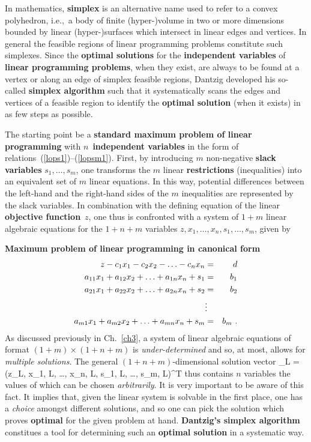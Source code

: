\medskip
\noindent
In mathematics, {\bf simplex} is an alternative name used to refer 
to a convex polyhedron, i.e.,~a body of finite (hyper-)volume in 
two or more dimensions bounded by linear (hyper-)surfaces which 
intersect in linear edges and vertices. In general the feasible 
regions of linear programming problems constitute such simplexes. 
Since the {\bf optimal solutions} for the {\bf independent 
variables} of {\bf linear programming problems},
when they exist, are always to be found at a vertex or along an 
edge of simplex feasible regions, Dantzig developed his so-called 
{\bf simplex algorithm} such that it systematically scans the 
edges and vertices of a feasible region to identify the {\bf 
optimal solution} (when it exists) in as few steps as possible.

\medskip
\noindent
The starting point be a {\bf standard maximum problem of linear 
programming} with $n$~{\bf independent variables} in the form of 
relations~(\ref{lops1})--(\ref{lopsm1}). First, by introducing $m$ 
non-negative {\bf slack variables} $s_{1}, \ldots, s_{m}$, one 
transforms the $m$ linear {\bf restrictions} (inequalities) into 
an equivalent set of $m$ linear equations. In this way, potential 
differences between the left-hand and the right-hand sides of the 
$m$ inequalities are represented by the slack variables. In 
combination with the defining equation of the linear {\bf objective
function}~$z$, one thus is confronted with a system of $1+m$ 
linear algebraic equations for the $1+n+m$ variables $z, x_{1},
\ldots, x_{n}, s_{1}, \ldots, s_{m}$, given by

\medskip
\noindent
{\bf Maximum problem of linear programming in canonical form}
\nopagebreak
%
\begin{eqnarray}
\lb{lopk1}
z - c_{1}x_{1} - c_{2}x_{2} - \ldots - c_{n}x_{n} & = & d \\
%
a_{11}x_{1} + a_{12}x_{2} + \ldots + a_{1n}x_{n} + s_{1} & = & b_{1} \\
%
a_{21}x_{1} + a_{22}x_{2} + \ldots + a_{2n}x_{n} + s_{2} & = & b_{2} \\
%
 & \vdots & \nonumber \\
%
\lb{lopkm1}
a_{m1}x_{1} + a_{m2}x_{2} + \ldots + a_{mn}x_{n} + s_{m} & = & b_{m} \ .
\end{eqnarray}
%
As discussed previously in Ch.~\ref{ch3}, a system of linear 
algebraic equations of format $(1+m) \times (1+n+m)$ is 
\emph{under-determined} and so, at most, allows for \emph{multiple 
solutions}. The general $(1+n+m)$-dimensional solution vector
%
\be
{}_{L} = \left(z_{L}, x_{1, L}, \ldots, x_{n, L},
s_{1, L}, \ldots, s_{m, L}\right)^{T}
\ee
%
thus contains $n$ variables the values of which can be chosen 
\emph{arbitrarily}. It is very important to be aware of this fact. 
It implies that, given the linear system is solvable in the first 
place, one has a \emph{choice} amongst different solutions, and so 
one can pick the solution which proves {\bf optimal} for the given 
problem at hand. {\bf Dantzig's simplex algorithm} constitues a 
tool for determining such an {\bf optimal solution} in a 
systematic way.

